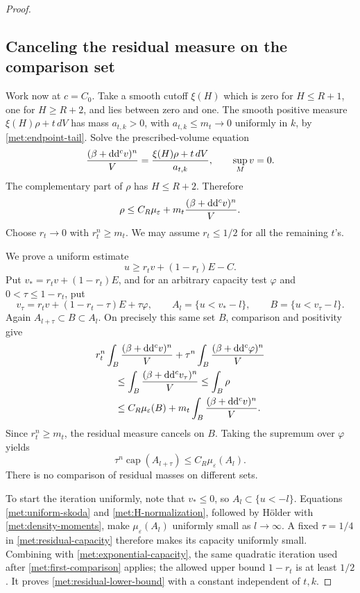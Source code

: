 \begin{proof}
\subsection*{Canceling the residual measure on the comparison set}

Work now at \(c=C_0\).  Take a smooth cutoff \(\xi(H)\) which is zero
for \(H\leq R+1\), one for \(H\geq R+2\), and lies between zero
and one.  The smooth positive measure
\(\xi(H)\rho+t\,dV\) has mass \(a_{t,k}>0\), with
\(a_{t,k}\leq m_t\to0\) uniformly in \(k\), by
\eqref{met:endpoint-tail}.  Solve the prescribed-volume equation
\cite{YauCalabi}
\[
 \frac{(\beta+\mathrm{d}\mathrm{d}^{c} v)^n}{V}
     =\frac{\xi(H)\rho+t\,dV}{a_{t,k}},
 \qquad \sup_Mv=0.
\]
The complementary part of \(\rho\) has \(H\leq R+2\).  Therefore
\begin{equation}
 \label{met:residual-domination}
 \rho\leq C_R\mu_\varepsilon
       +m_t\frac{(\beta+\mathrm{d}\mathrm{d}^{c} v)^n}{V}.
\end{equation}
Choose \(r_t\to0\) with \(r_t^n\geq m_t\).  We may assume
\(r_t\leq1/2\) for all the remaining \(t\)'s.

We prove a uniform estimate
\begin{equation}
 \label{met:residual-lower-bound}
 u\geq r_tv+(1-r_t)E-C.
\end{equation}
Put \(v_*=r_tv+(1-r_t)E\), and for an arbitrary capacity test
\(\varphi\) and \(0<\tau\leq1-r_t\), put
\[
 v_\tau=r_tv+(1-r_t-\tau)E+\tau\varphi,
 \qquad A_l=\{u<v_*-l\},
 \qquad B=\{u<v_\tau-l\}.
\]
Again \(A_{l+\tau}\subset B\subset A_l\).  On precisely this
same set \(B\), comparison and positivity give
\begin{align*}
 &r_t^n\int_B\frac{(\beta+\mathrm{d}\mathrm{d}^{c} v)^n}{V}
 +\tau^n\int_B\frac{(\beta+\mathrm{d}\mathrm{d}^{c}\varphi)^n}{V}\\
 &\qquad\leq\int_B\frac{(\beta+\mathrm{d}\mathrm{d}^{c} v_\tau)^n}{V}
 \leq\int_B\rho\\
 &\qquad\leq C_R\mu_\varepsilon(B)
       +m_t\int_B\frac{(\beta+\mathrm{d}\mathrm{d}^{c} v)^n}{V}.
\end{align*}
Since \(r_t^n\geq m_t\), the residual measure cancels on \(B\).
Taking the supremum over \(\varphi\) yields
\begin{equation}
 \label{met:residual-capacity}
 \tau^n\operatorname{cap}(A_{l+\tau})
 \leq C_R\mu_\varepsilon(A_l).
\end{equation}
There is no comparison of residual masses on different sets.

To start the iteration uniformly, note that \(v_*\leq0\), so
\(A_l\subset\{u<-l\}\).  Equations
\eqref{met:uniform-skoda} and \eqref{met:H-normalization}, followed
by H\"older with \eqref{met:density-moments}, make
\(\mu_\varepsilon(A_l)\) uniformly small as \(l\to\infty\).
A fixed \(\tau=1/4\) in \eqref{met:residual-capacity} therefore
makes its capacity uniformly small.  Combining with
\eqref{met:exponential-capacity}, the same quadratic iteration used
after \eqref{met:first-comparison} applies; the allowed upper bound
\(1-r_t\) is at least \(1/2\).  It proves
\eqref{met:residual-lower-bound} with a constant independent of
\(t,k\).


\end{proof}
